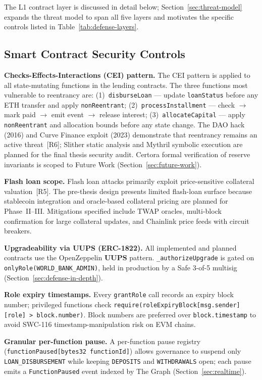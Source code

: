 \documentclass[12pt,a4paper]{report}
\begin{document}
The L1 contract layer is discussed in detail below; Section~\ref{sec:threat-model} expands the threat model to span all five layers and motivates the specific controls listed in Table~\ref{tab:defense-layers}.

\subsection{Smart Contract Security Controls}
\label{sec:contract-security}

\textbf{Checks-Effects-Interactions (CEI) pattern.} The CEI pattern is applied to all state-mutating functions in the lending contracts. The three functions most vulnerable to reentrancy are: (1)~\texttt{disburseLoan} --- update \texttt{loanStatus} before any ETH transfer and apply \texttt{nonReentrant}; (2)~\texttt{processInstallment} --- check $\to$ mark paid $\to$ emit event $\to$ release interest; (3)~\texttt{allocateCapital} --- apply \texttt{nonReentrant} and allocation bounds before any state change. The DAO hack (2016) and Curve Finance exploit (2023) demonstrate that reentrancy remains an active threat~[R6]; Slither static analysis and Mythril symbolic execution are planned for the final thesis security audit. Certora formal verification of reserve invariants is scoped to Future Work (Section~\ref{sec:future-work}).

\textbf{Flash loan scope.} Flash loan attacks primarily exploit price-sensitive collateral valuation~[R5]. The pre-thesis design presents limited flash-loan surface because stablecoin integration and oracle-based collateral pricing are planned for Phase~II--III. Mitigations specified include TWAP oracles, multi-block confirmation for large collateral updates, and Chainlink price feeds with circuit breakers.

\textbf{Upgradeability via UUPS (ERC-1822).} All implemented and planned contracts use the OpenZeppelin \textbf{UUPS} pattern. \texttt{\_authorizeUpgrade} is gated on \texttt{onlyRole(WORLD\_BANK\_ADMIN)}, held in production by a Safe 3-of-5 multisig (Section~\ref{sec:defense-in-depth}).

\textbf{Role expiry timestamps.} Every \texttt{grantRole} call records an expiry block number; privileged functions check \texttt{require(roleExpiryBlock[msg.sender][role] > block.number)}. Block numbers are preferred over \texttt{block.timestamp} to avoid SWC-116 timestamp-manipulation risk on EVM chains.

\textbf{Granular per-function pause.} A per-function pause registry (\texttt{functionPaused[bytes32 functionId]}) allows governance to suspend only \texttt{LOAN\_DISBURSEMENT} while keeping \texttt{DEPOSITS} and \texttt{WITHDRAWALS} open; each pause emits a \texttt{FunctionPaused} event indexed by The Graph (Section~\ref{sec:realtime}).
\end{document}

